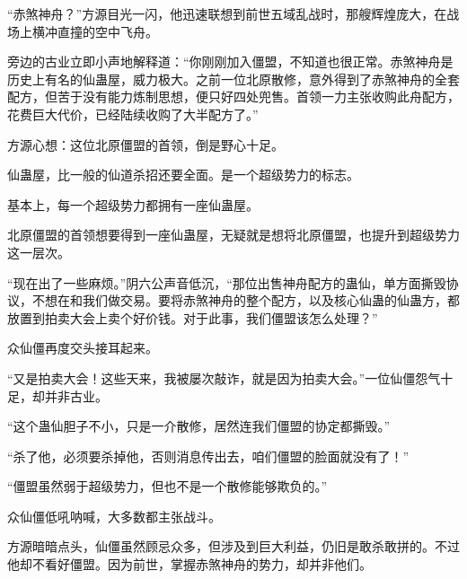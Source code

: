 \begin{this_body}
“赤煞神舟？”方源目光一闪，他迅速联想到前世五域乱战时，那艘辉煌庞大，在战场上横冲直撞的空中飞舟。

旁边的古业立即小声地解释道：“你刚刚加入僵盟，不知道也很正常。赤煞神舟是历史上有名的仙蛊屋，威力极大。之前一位北原散修，意外得到了赤煞神舟的全套配方，但苦于没有能力炼制思想，便只好四处兜售。首领一力主张收购此舟配方，花费巨大代价，已经陆续收购了大半配方了。”

方源心想：这位北原僵盟的首领，倒是野心十足。

仙蛊屋，比一般的仙道杀招还要全面。是一个超级势力的标志。

基本上，每一个超级势力都拥有一座仙蛊屋。

北原僵盟的首领想要得到一座仙蛊屋，无疑就是想将北原僵盟，也提升到超级势力这一层次。

“现在出了一些麻烦。”阴六公声音低沉，“那位出售神舟配方的蛊仙，单方面撕毁协议，不想在和我们做交易。要将赤煞神舟的整个配方，以及核心仙蛊的仙蛊方，都放置到拍卖大会上卖个好价钱。对于此事，我们僵盟该怎么处理？”

众仙僵再度交头接耳起来。

“又是拍卖大会！这些天来，我被屡次敲诈，就是因为拍卖大会。”一位仙僵怨气十足，却并非古业。

“这个蛊仙胆子不小，只是一介散修，居然连我们僵盟的协定都撕毁。”

“杀了他，必须要杀掉他，否则消息传出去，咱们僵盟的脸面就没有了！”

“僵盟虽然弱于超级势力，但也不是一个散修能够欺负的。”

众仙僵低吼呐喊，大多数都主张战斗。

方源暗暗点头，仙僵虽然顾忌众多，但涉及到巨大利益，仍旧是敢杀敢拼的。不过他却不看好僵盟。因为前世，掌握赤煞神舟的势力，却并非他们。

\end{this_body}

